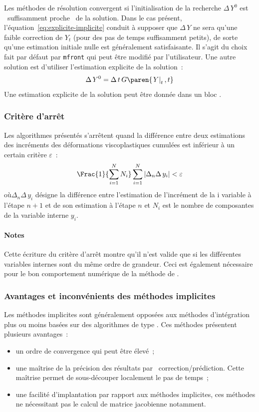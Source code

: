 \documentclass[rectoverso,pleiades,pstricks,leqno,anti]{texmf/note_technique_2010}
\makeatletter
\newcommand{\mfront}{\texttt{mfront}}
\newcommand{\mkey}[1]{\index{mkeys}{#1@\symbol{64}#1}{\texttt{@#1}}}
\newcommand{\debutpas}[1]{\ensuremath{\left.#1\right|_{t}}}
\makeatother
\begin{document}
Les méthodes de résolution convergent si l'initialisation de la
recherche \(\Delta\, Y^{0}\) est \og~suffisamment proche~\fg{} de la
solution. Dans le cas présent, l'équation~\eqref{eq:explicite-implicite} conduit à
supposer que \(\Delta\, Y\) ne sera qu'une faible correction de
\(Y_{t}\) (pour des pas de temps suffisamment petits), de sorte qu'une
estimation initiale nulle est généralement satisfaisante. Il s'agit du
choix fait par défaut par \mfront{} qui peut être modifié par
l'utilisateur. Une autre solution est d'utiliser l'estimation explicite
de la solution~:
\[
\Delta\, Y^{0} = \Delta\,t\,G\paren{\debutpas{Y},t}
\]
Une estimation explicite de la solution peut être donnée dans un bloc
\mkey{Predictor}.

\subsubsection{Critère d'arrêt}

Les algorithmes présentés s'arrêtent quand la différence entre deux
estimations des incréments des déformations viscoplastiques cumulées est
inférieur à un certain critère \(\varepsilon\)~:
\[
\Frac{1}{\displaystyle\sum_{i=1}^{N}N_{i}}\displaystyle\sum_{i=1}^{N}\left|\Delta_{n}\Delta\,
y_{i}\right|<\varepsilon
\]
où\(\Delta_{n}\Delta\,y_{i}\) désigne la
différence entre l'estimation de l'incrément de la i\ieme{} variable à
l'étape \(n+1\) et de son estimation à l'étape \(n\) et \(N_{i}\) est le
nombre de composantes de la variable interne \(y_{i}\).

\paragraph{Notes} Cette écriture du critère d'arrêt
montre qu'il n'est valide que si les différentes variables internes sont
du même ordre de grandeur. Ceci est également nécessaire pour le bon
comportement numérique de la méthode de .

\subsubsection{Avantages et inconvénients des méthodes implicites} Les
méthodes implicites sont généralement opposées aux méthodes
d'intégration plus ou moins basées sur des algorithmes de type
. Ces méthodes présentent plusieurs avantages~:
\begin{itemize}
\item un ordre de convergence qui peut être élevé~;
\item une maîtrise de la précision des résultats par
  \og~correction/prédiction\fg{}. Cette maîtrise permet de
  sous-découper localement le pas de temps~;
\item une facilité d'implantation par rapport aux méthodes implicites,
  ces méthodes ne nécessitant pas le calcul de matrice jacobienne
  notamment.
\end{itemize}
\end{document}
